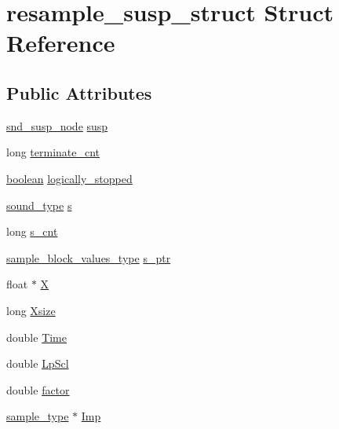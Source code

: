 \hypertarget{structresample__susp__struct}{}\section{resample\+\_\+susp\+\_\+struct Struct Reference}
\label{structresample__susp__struct}
\subsection*{Public Attributes}
\begin{DoxyCompactItemize}
\item 
\hyperlink{sound_8h_a6b268203688a934bd798ceb55f85d4c0}{snd\+\_\+susp\+\_\+node} \hyperlink{structresample__susp__struct_a7b68f4219c2a8ed14a9159e97261cc22}{susp}
\item 
long \hyperlink{structresample__susp__struct_a2b492b96f18aa250e3dcd38f0ed374ac}{terminate\+\_\+cnt}
\item 
\hyperlink{cext_8h_a7670a4e8a07d9ebb00411948b0bbf86d}{boolean} \hyperlink{structresample__susp__struct_a6f423ab6a4d2906155c8f7971a2b51da}{logically\+\_\+stopped}
\item 
\hyperlink{sound_8h_a792cec4ed9d6d636d342d9365ba265ea}{sound\+\_\+type} \hyperlink{structresample__susp__struct_ab5e90e8f40ae823d394d8a03956d6a0e}{s}
\item 
long \hyperlink{structresample__susp__struct_afc2fc9ea06e1b4edadd8e116327ccf2b}{s\+\_\+cnt}
\item 
\hyperlink{sound_8h_a83d17f7b465d1591f27cd28fc5eb8a03}{sample\+\_\+block\+\_\+values\+\_\+type} \hyperlink{structresample__susp__struct_ad440beef67be3cc6c4f17ae2d7b7a9f8}{s\+\_\+ptr}
\item 
float $\ast$ \hyperlink{structresample__susp__struct_a4330450bbb9aadd67d9504d26f7f4ed4}{X}
\item 
long \hyperlink{structresample__susp__struct_a2bb2e66895b2954fe66e32e49183c4cf}{Xsize}
\item 
double \hyperlink{structresample__susp__struct_a0d18bcc4f4fa6c528de65a4a0dceaa4f}{Time}
\item 
double \hyperlink{structresample__susp__struct_aec6e0c2a273dc072c3eb41b0ac75f774}{Lp\+Scl}
\item 
double \hyperlink{structresample__susp__struct_a65c61aa8e789656ca226d1340c1e22ef}{factor}
\item 
\hyperlink{sound_8h_a3a9d1d4a1c153390d2401a6e9f71b32c}{sample\+\_\+type} $\ast$ \hyperlink{structresample__susp__struct_aba6ac02376ae5614b4d20fd24f67c490}{Imp}

\end{DoxyCompactItemize}
